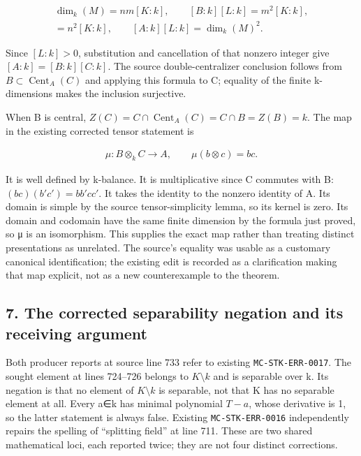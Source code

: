 \[\begin{gathered}
\operatorname{dim}_{k}(M)=nm[K:k],\qquad [B:k][L:k]=m^{2}[K:k],\\[C:k]=n^{2}[K:k],\qquad [A:k][L:k]=\operatorname{dim}_{k}(M)^{2}.
\end{gathered}\]

Since \([L:k]>0\), substitution and cancellation of that nonzero integer give \([A:k]=[B:k][C:k]\). The source double-centralizer conclusion follows from \(B\subset \operatorname{Cent}_{A}(C)\) and applying this formula to C; equality of the finite k-dimensions makes the inclusion surjective.

When B is central, \(Z(C)=C\cap \operatorname{Cent}_{A}(C)=C\cap B=Z(B)=k\). The map in the existing corrected tensor statement is

\[\begin{gathered}
\mu :B\otimes _{k} C\to A,\qquad \mu (b\otimes c)=bc.
\end{gathered}\]

It is well defined by k-balance. It is multiplicative since C commutes with B: \((bc)(b'c')=bb'cc'\). It takes the identity to the nonzero identity of A. Its domain is simple by the source tensor-simplicity lemma, so its kernel is zero. Its domain and codomain have the same finite dimension by the formula just proved, so μ is an isomorphism. This supplies the exact map rather than treating distinct presentations as unrelated. The source's equality was usable as a customary canonical identification; the existing edit is recorded as a clarification making that map explicit, not as a new counterexample to the theorem.

\subsection{7. The corrected separability negation and its receiving argument}\label{the-corrected-separability-negation-and-its-receiving-argument}

Both producer reports at source line 733 refer to existing \texttt{MC-STK-ERR-0017}. The sought element at lines 724--726 belongs to \(K\setminus k\) and is separable over k. Its negation is that no element of \(K\setminus k\) is separable, not that K has no separable element at all. Every a∈k has minimal polynomial \(T-a\), whose derivative is 1, so the latter statement is always false. Existing \texttt{MC-STK-ERR-0016} independently repairs the spelling of ``splitting field'' at line 711. These are two shared mathematical loci, each reported twice; they are not four distinct corrections.


